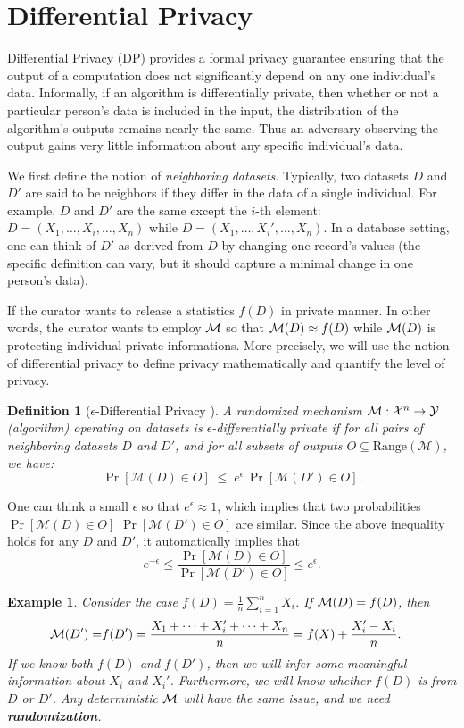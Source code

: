 \documentclass[11pt, a4paper]{article}
\newtheorem{definition}{Definition}
\newtheorem{example}{Example}
\begin{document}
\section{Differential Privacy}

Differential Privacy (DP) provides a formal privacy guarantee ensuring that the output of a computation does not significantly depend on any one individual's data.
Informally, if an algorithm is differentially private, then whether or not a particular person's data is included in the input,
the distribution of the algorithm's outputs remains nearly the same.
Thus an adversary observing the output gains very little information about any specific individual's data.

We first define the notion of \emph{neighboring datasets}.
Typically, two datasets $D$ and $D'$ are said to be neighbors if they differ in the data of a single individual.
For example, $D$ and $D'$ are the same except the $i$-th element: $D = (X_1, \dots, X_i, \dots, X_n)$ while $D = (X_1, \dots, X_i', \dots, X_n)$.
In a database setting, one can think of $D'$ as derived from $D$ by changing one record's values 
(the specific definition can vary, but it should capture a minimal change in one person's data).

If the curator wants to release a statistics $f(D)$ in private manner.
In other words, the curator wants to employ ${\cal M}$ so that ${\cal M}(D) \approx f(D)$ while ${\cal M}(D)$ is protecting individual private informations.
More precisely, we will use the notion of differential privacy to define privacy mathematically and quantify the level of privacy.
\begin{definition}[$\epsilon$-Differential Privacy \cite{Dwork2006}] \label{def:dp}
A randomized mechanism $\mathcal{M}: {\cal X}^n \rightarrow {\cal Y}$ (algorithm) operating on datasets is $\epsilon$-differentially private if for all pairs of neighboring datasets $D$ and $D'$,
and for all subsets of outputs $O \subseteq \text{Range}(\mathcal{M})$, we have:
\[ 
\Pr[\mathcal{M}(D) \in O] \;\le\; e^{\epsilon} \,\Pr[\mathcal{M}(D') \in O].
\] 
\end{definition}
One can think a small $\epsilon$ so that $e^\epsilon \approx 1$,
which implies that two probabilities $\Pr[\mathcal{M}(D) \in O]$ $\Pr[\mathcal{M}(D') \in O]$ are similar.
Since the above inequality holds for any $D$ and $D'$, it automatically implies that
\[ 
e^{-\epsilon} \leq  \frac{\Pr[\mathcal{M}(D) \in O]}{\Pr[\mathcal{M}(D') \in O]} \leq e^{\epsilon}.
\] 

\begin{example}
    Consider the case $f(D) = \frac{1}{n} \sum_{i=1}^n X_i$.
    If ${\cal M}(D) = f(D)$, then 
    \begin{align}
        {\cal M}(D') =& f(D')= \frac{X_1+\dots+X_i'+\dots+X_n}{n} = f(X) + \frac{X_i'-X_i}{n}.
    \end{align}
    If we know both $f(D)$ and $f(D')$, then we will infer some meaningful information about $X_i$ and $X_i'$.
    Furthermore, we will know whether $f(D)$ is from $D$ or $D'$.
    Any deterministic ${\cal M}$ will have the same issue, and we need {\bf randomization}.
\end{example}
\end{document}
